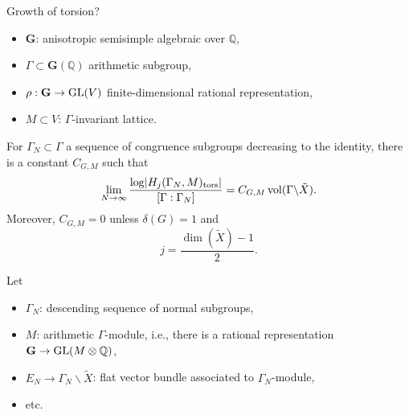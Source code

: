 \documentclass[reqno]{amsart} 
\begin{document}
Growth of torsion?
\begin{itemize}
\item $\mathbf{G}$: anisotropic semisimple algebraic over $\mathbb{Q}$,
\item $\Gamma \subset \mathbf{G} (\mathbb{Q})$ arithmetic subgroup,
\item $\rho : \mathbf{G} \rightarrow \operatorname{GL}(V)$ finite-dimensional rational representation,
\item $M \subset V$: $\Gamma$-invariant lattice.
\end{itemize}

\begin{conjecture}\label{conjecture:cj45oajukk}
  For $\Gamma_N \subset \Gamma$ a sequence of congruence subgroups decreasing to the identity, there is a constant $C_{G, M}$ such that
  \begin{equation*}
    \lim_{N \rightarrow \infty }
    \frac{\log \lvert H_j (\Gamma_N, M)_{\operatorname{tors}} \rvert}{
      [\Gamma : \Gamma_N ]
    }
    = C_{G, M} \operatorname{vol} (\Gamma \backslash \tilde{X}).
  \end{equation*}
  Moreover, $C_{G, M} = 0$ unless $\delta (G) = 1$ and
  \begin{equation*}
    j = \frac{\dim (\tilde{X})  - 1}{2}.
  \end{equation*}
\end{conjecture}

Let
\begin{itemize}
\item $\Gamma_N$: descending sequence of normal subgroups,
\item $M$: arithmetic $\Gamma$-module, i.e., there is a rational representation $\mathbf{G} \rightarrow \operatorname{GL} (M \otimes \mathbb{Q})$,
\item $E_N \rightarrow \Gamma_N \backslash \tilde{X}$: flat vector bundle associated to $\Gamma_N $-module,
\item etc.
\end{itemize}

{} 
\end{document}

